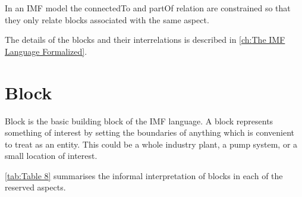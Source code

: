 \documentclass[../main.tex]{subfiles}
\begin{document}

In an IMF model the connectedTo and partOf relation
are constrained so that they only relate blocks associated with the same aspect.

The details of the blocks and their interrelations is described in \autoref{ch:The IMF Language Formalized}.


\section{Block}
 Block is the basic building block of the IMF language. A block represents something of interest by
setting the boundaries of anything which is convenient to treat as an entity. This could be a whole industry plant, a
pump system, or a small location of interest.

\autoref{tab:Table 8} summarises the informal interpretation of blocks in each of the reserved aspects. 


\def\rowskp{\\[-1.5ex]}
\end{document}
